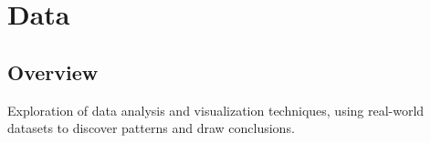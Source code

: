 \chapter{Data}

\section*{Overview}
Exploration of data analysis and visualization techniques, using real-world datasets to discover patterns and draw conclusions.

